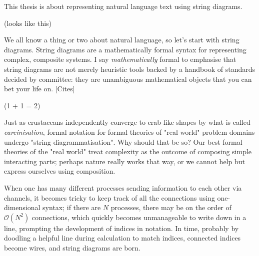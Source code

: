 This thesis is about representing natural language text using string diagrams.

(looks like this)

We all know a thing or two about natural language, so let's start with string diagrams. String diagrams are a mathematically formal syntax for representing complex, composite systems. I say \emph{mathematically} formal to emphasise that string diagrams are not merely heuristic tools backed by a handbook of standards decided by committee: they are unambiguous mathematical objects that you can bet your life on. [Cites]

(1 + 1 = 2)

Just as crustaceans independently converge to crab-like shapes by what is called \emph{carcinisation}, formal notation for formal theories of "real world" problem domains undergo "string diagrammatisation". Why should that be so? Our best formal theories of the "real world" treat complexity as the outcome of composing simple interacting parts; perhaps nature really works that way, or we cannot help but express ourselves using composition.

When one has many different processes sending information to each other via channels, it becomes tricky to keep track of all the connections using one-dimensional syntax; if there are $N$ processes, there may be on the order of $\mathcal{O}(N^2)$ connections, which quickly becomes unmanageable to write down in a line, prompting the development of indices in notation. In time, probably by doodling a helpful line during calculation to match indices, connected indices become wires, and string diagrams are born.

